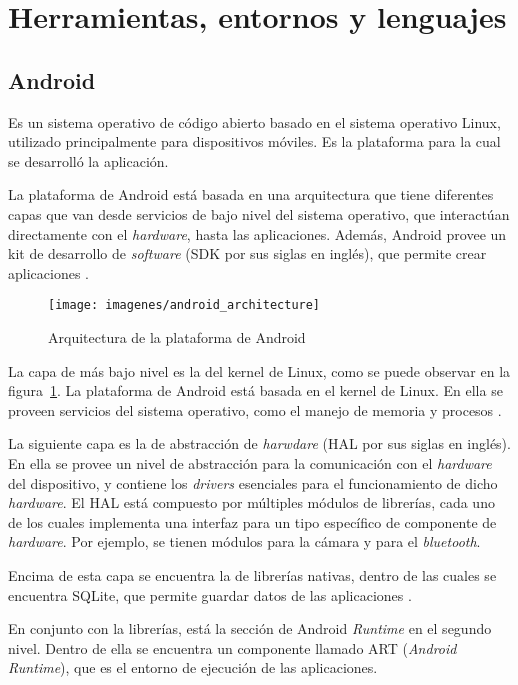 \section{Herramientas, entornos y lenguajes} \label{Herramientas, entornos y lenguajes}


\subsection{Android}
Es un sistema operativo de código abierto basado en el sistema operativo Linux, utilizado principalmente para dispositivos móviles\cite{AND1}. Es la plataforma para la cual se desarrolló la aplicación. 

La plataforma de Android está basada en una arquitectura que tiene diferentes capas que van desde servicios de bajo nivel del sistema operativo, que interactúan directamente con el \textit{hardware}, hasta las aplicaciones. Además, Android provee un kit de desarrollo de \textit{software} (SDK por sus siglas en inglés), que permite crear aplicaciones \cite{AND3}.

\begin{figure}[ht]
  \centering
  \texttt{[image: imagenes/android\_architecture]}
  \caption{Arquitectura de la plataforma de Android}
  \label{fig:arquitecturaAndroid}
\end{figure}

La capa de más bajo nivel es la del kernel de Linux, como se puede observar en la figura~\ref{fig:arquitecturaAndroid}. La plataforma de Android está basada en el kernel de Linux. En ella se proveen servicios del sistema operativo, como el manejo de memoria y procesos \cite{AND3}.

La siguiente capa es la de abstracción de \textit{harwdare} (HAL por sus siglas en inglés). En ella se provee un nivel de abstracción para la comunicación con el \textit{hardware} del dispositivo, y contiene los \textit{drivers} esenciales para el funcionamiento de dicho \textit{hardware}. El HAL está compuesto por múltiples módulos de librerías, cada uno de los cuales implementa una interfaz para un tipo específico de componente de \textit{hardware}. Por ejemplo, se tienen módulos para la cámara y para el \textit{bluetooth}.

Encima de esta capa se encuentra la de librerías nativas, dentro de las cuales se encuentra SQLite, que permite guardar datos de las aplicaciones \cite{AND3}.

En conjunto con la librerías, está la sección de Android \textit{Runtime} en el segundo nivel. Dentro de ella se encuentra un componente llamado ART (\textit{Android Runtime}), que es el entorno de ejecución de las aplicaciones\cite{AND3}.

